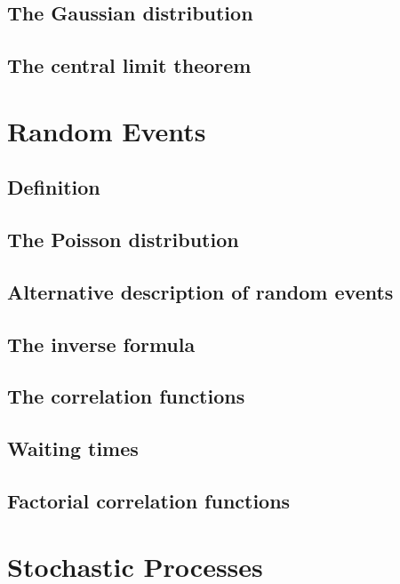 \documentclass{book}
\theoremstyle{plain}
\theoremstyle{definition}
\theoremstyle{remark}
\begin{document}
\section{The Gaussian distribution}

\section{The central limit theorem}




\chapter{Random Events}

\section{Definition}

\section{The Poisson distribution}

\section{Alternative description of random events}

\section{The inverse formula}

\section{The correlation functions}

\section{Waiting times}

\section{Factorial correlation functions}


\chapter{Stochastic Processes}
\end{document}

